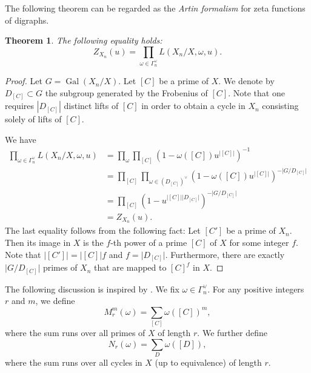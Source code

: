 \documentclass[11pt]{amsart}
\DeclareMathOperator{\Gal}{Gal}
\newtheorem{theorem}{Theorem}[section]
\numberwithin{equation}{section}
\theoremstyle{remark}
\newcommand{\?}{\stackrel{?}{=}}
\begin{document}
The following theorem can be regarded as the \textit{Artin formalism} for zeta functions of digraphs.
\begin{theorem}
\label{Artin-formalism}
   The following equality holds:
    \[Z_{X_n}(u)=\prod_{\omega\in\Gamma_n^\vee}L(X_n/X,\omega,u).\]
\end{theorem}
\begin{proof}
Let $G=\Gal(X_n/X)$. Let $[C]$ be a prime of $X$. We denote by $D_{[C]}\subset G$ the subgroup generated by the Frobenius of $[C]$. Note that one requires $|D_{[C]}|$ distinct lifts of $[C]$ in order to obtain a cycle in $X_n$ consisting solely of lifts of $[C]$.

We have
    \begin{align*}
        \prod_{\omega\in{\Gamma_n^\vee}}L(X_n/X,\omega,u)&=\prod_\omega\prod_{[C]}(1-\omega([C])u^{\vert [C]\vert})^{-1}\\
        &=\prod_{[C]}\prod_{\omega\in (D_{[C]})^\vee}(1-\omega([C])u^{\vert[C]\vert})^{-\vert G/D_{[C]} \vert}\\
       &=\prod_{[C]}(1-u^{\vert [C]\vert \vert D_{[C]}\vert})^{-\vert G/D_{[C]} \vert}\\
       &=Z_{X_n}(u).
    \end{align*}
    The last equality follows from the following fact: Let $[C']$ be a prime of $X_n$. Then its image in $X$ is the $f$-th power of a prime $[C]$ of $X$ for some integer $f$. Note that $\vert [C']\vert=\vert [C]\vert f$ and $f=\vert D_{[C]}\vert$. Furthermore, there are exactly $\vert G/D_{[C]}\vert $ primes of $X_n$ that are mapped to $[C]^f$ in $X$. 
\end{proof}
The following discussion is inspired by \cite[Section 2]{ks}.
We fix $\omega\in\Gamma_n^\vee$. For any positive integers $r$ and $m$, we define
\[M_r^m(\omega)=\sum_{[C]} \omega([C])^m,\]
where the sum runs over all primes of $X$ of length $r$. We further define
\[N_r(\omega)=\sum_D\omega([D]),\]
where the sum runs over all cycles in $X$ (up to equivalence) of length $r$.
\end{document}
